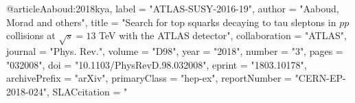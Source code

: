 @article{Aaboud:2018kya,
      label          = "ATLAS-SUSY-2016-19",
      author         = "Aaboud, Morad and others",
      title          = "{Search for top squarks decaying to tau sleptons in $pp$
                        collisions at  $\sqrt{s}= 13$ TeV with the ATLAS
                        detector}",
      collaboration  = "ATLAS",
      journal        = "Phys. Rev.",
      volume         = "D98",
      year           = "2018",
      number         = "3",
      pages          = "032008",
      doi            = "10.1103/PhysRevD.98.032008",
      eprint         = "1803.10178",
      archivePrefix  = "arXiv",
      primaryClass   = "hep-ex",
      reportNumber   = "CERN-EP-2018-024",
      SLACcitation   = "%
}

